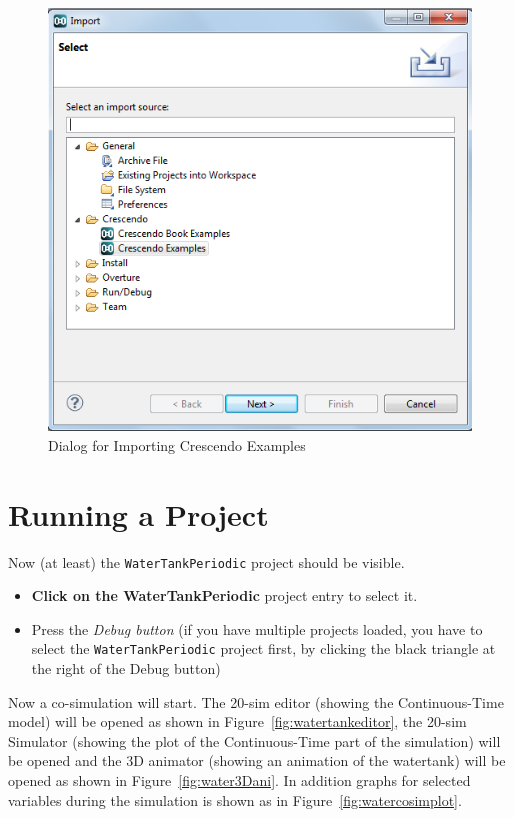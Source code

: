 \documentclass{crescendorepchap}
\begin{document}
\begin{figure}[htbp]
\centering
\includegraphics[width=.8\textwidth]{images/DestecsImportDialog.png}
\caption{Dialog for Importing Crescendo Examples\label{fig:importex}}
\end{figure}

\section{Running a Project}

Now (at least) the \texttt{WaterTankPeriodic} project should be visible.

\begin{itemize}
\item
  \textbf{Click on the WaterTankPeriodic} project entry to select it.
\item
  Press the \emph{Debug button}
  (if you have multiple
  projects loaded, you have to select the \texttt{Water\-Tank\-Periodic} project first, by
  clicking the black triangle at the right of the Debug button)
\end{itemize}

Now a co-simulation will start. The 20-sim editor (showing the
Continuous-Time model) will be opened as shown in
Figure~\ref{fig:watertankeditor}, the 20-sim Simulator (showing the
plot of the Continuous-Time part of the simulation) will be opened and
the 3D animator (showing an animation of the watertank) will be opened
as shown in Figure~\ref{fig:water3Dani}. In addition graphs for
selected variables during the simulation is shown as in
Figure~\ref{fig:watercosimplot}.
\end{document}
